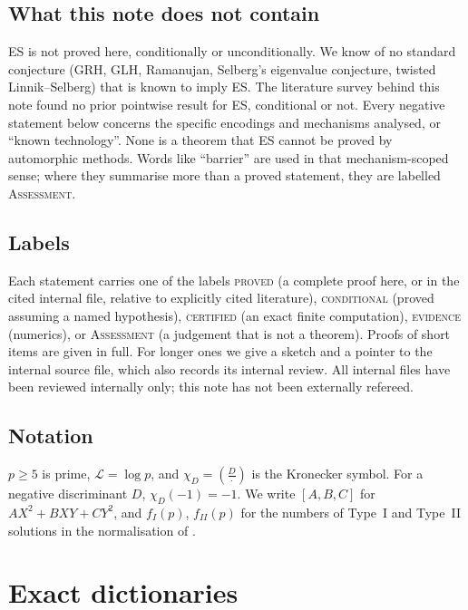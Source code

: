 \documentclass[10pt,reqno]{amsart}
\theoremstyle{definition}
\numberwithin{equation}{section}
\newcommand{\cL}{\mathcal L}
\newcommand{\status}[1]{\textup{\textsc{#1}}}
\newcommand{\leg}[2]{\left(\frac{#1}{#2}\right)}
\begin{document}
\subsection*{What this note does not contain}
ES is not proved here, conditionally or unconditionally. We know of no
standard conjecture (GRH, GLH, Ramanujan, Selberg's eigenvalue conjecture,
twisted Linnik--Selberg) that is known to imply ES. The literature survey
behind this note \cite{LA} found no prior pointwise result for ES,
conditional or not. Every negative statement below concerns the specific
encodings and mechanisms analysed, or ``known technology''. None is a
theorem that ES cannot be proved by automorphic methods. Words like
``barrier'' are used in that mechanism-scoped sense; where they summarise
more than a proved statement, they are labelled \status{Assessment}.

\subsection*{Labels}
Each statement carries one of the labels \status{proved} (a complete proof
here, or in the cited internal file, relative to explicitly cited
literature), \status{conditional} (proved assuming a named hypothesis),
\status{certified} (an exact finite computation), \status{evidence}
(numerics), or \status{Assessment} (a judgement that is not a theorem).
Proofs of short items are given in full. For longer ones we give a sketch
and a pointer to the internal source file, which also records its internal
review. All internal files have been reviewed internally only; this note
has not been externally refereed.

\subsection*{Notation}
$p\ge5$ is prime, $\cL=\log p$, and $\chi_{D}=\leg{D}{\cdot}$ is the
Kronecker symbol. For a negative discriminant $D$, $\chi_D(-1)=-1$. We
write $[A,B,C]$ for $AX^2+BXY+CY^2$, and $f_I(p)$, $f_{II}(p)$ for the
numbers of Type~I and Type~II solutions in the normalisation of
\cite[\S2]{ET}.

\section{Exact dictionaries}\label{sec:dict}
\end{document}

